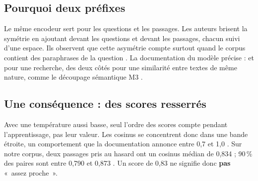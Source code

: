 \begin{center}
\end{center}

\subsection{Pourquoi deux préfixes}

Le même encodeur sert pour les questions et les passages. Les auteurs brisent la symétrie en ajoutant
 devant les questions et  devant les passages, chacun suivi d'une espace. Ils observent que cette asymétrie
compte surtout quand le corpus contient des paraphrases de la question \source. La documentation du
modèle précise :  et  pour une recherche,  des deux côtés pour une
similarité entre textes de même nature, comme le découpage sémantique M3 \source.

\subsection{Une conséquence : des scores resserrés}

Avec une température aussi basse, seul l'ordre des scores compte pendant l'apprentissage, pas leur valeur. Les
cosinus se concentrent donc dans une bande étroite, un comportement que la documentation annonce entre 0,7 et
1,0 \source. Sur notre corpus, deux passages pris au hasard ont un cosinus médian de 0,834 ; 90\,\% des paires sont
entre 0,790 et 0,873 \mesure. Un score de 0,83 ne signifie donc \textbf{pas} «~assez proche~».


